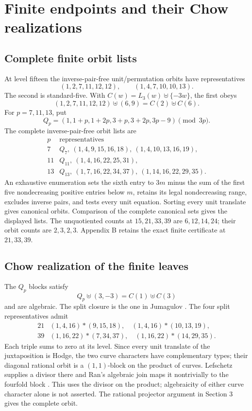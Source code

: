 \documentclass[11pt]{amsart}
\numberwithin{theorem}{section}
\theoremstyle{remark}
\numberwithin{equation}{section}
\begin{document}
\section{Finite endpoints and their Chow realizations}\label{sec:9}

\subsection{Complete finite orbit lists}\label{sec:9.1}

At level fifteen the inverse-pair-free unit/permutation orbits have
representatives
\[
(1,2,7,11,12,12),\qquad(1,4,7,10,10,13).
\]
The second is standard-five. With \(C(w)=L_3(w)\uplus\{-3w\}\), the
first obeys
\[
(1,2,7,11,12,12)\uplus(6,9)=C(2)\uplus C(6).
\]
For \(p=7,11,13\), put
\[
Q_p=(1,1+p,1+2p,3+p,3+2p,3p-9)\pmod{3p}.
\]
The complete inverse-pair-free orbit lists are
\[
\begin{array}{c|l}
p&\text{representatives}\\\hline
7&Q_7,\ (1,4,9,15,16,18),\ (1,4,10,13,16,19),\\
11&Q_{11},\ (1,4,16,22,25,31),\\
13&Q_{13},\ (1,7,16,22,34,37),\ (1,14,16,22,29,35).
\end{array}
\]
An exhaustive enumeration sets the sixth entry to \(3m\) minus the sum
of the first five nondecreasing positive entries below \(m\), retains
its legal nondecreasing range, excludes inverse pairs, and tests every
unit equation. Sorting every unit translate gives canonical orbits.
Comparison of the complete canonical sets gives the displayed lists.
The unquotiented counts at \(15,21,33,39\) are \(6,12,14,24\); their
orbit counts are \(2,3,2,3\). Appendix B retains the exact finite
certificate at \(21,33,39\).

\subsection{Chow realization of the finite leaves}\label{sec:9.2}

The \(Q_p\) blocks satisfy
\[
Q_p\uplus(3,-3)=C(1)\uplus C(3)
\]
and are algebraic. The split closure is the one in Jumagulov
\cite[Theorem 1.2, p.~4]{jumagulov2026}. The four split representatives admit
\[
\begin{array}{c|l}
21&(1,4,16)*(9,15,18),\quad(1,4,16)*(10,13,19),\\
39&(1,16,22)*(7,34,37),\quad(1,16,22)*(14,29,35).
\end{array}
\]
Each triple sums to zero at its level. Since every unit translate of
the juxtaposition is Hodge, the two curve characters have complementary
types; their diagonal rational orbit is a \((1,1)\)-block on the product
of curves. Lefschetz supplies a divisor there and Ran's algebraic join
\cite[Section 4, pp.~138--139]{ran1980} maps it nontrivially to the fourfold block
\cite[Proposition 4.6 and Corollary 4.7, p.~140]{ran1980}. This uses the divisor
on the product; algebraicity of either curve character alone is not
asserted. The rational projector argument in Section 3 gives the
complete orbit.
\end{document}
